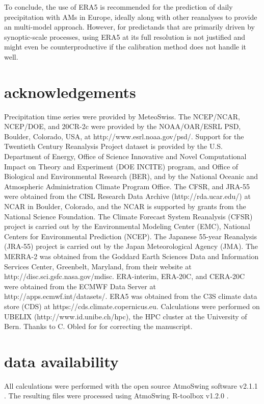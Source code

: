 \documentclass[alpha-refs]{wiley-article}
\begin{document}
To conclude, the use of ERA5 is recommended for the prediction of daily precipitation with AMs in Europe, ideally along with other reanalyses to provide an multi-model approach. However, for predictands that are primarily driven by synoptic-scale processes, using ERA5 at its full resolution is not justified and might even be counterproductive if the calibration method does not handle it well.



\section*{acknowledgements}
Precipitation time series were provided by MeteoSwiss. The NCEP/NCAR, NCEP/DOE, and 20CR-2c were provided by the NOAA/OAR/ESRL PSD, Boulder, Colorado, USA, at http://www.esrl.noaa.gov/psd/. Support for the Twentieth Century Reanalysis Project dataset is provided by the U.S. Department of Energy, Office of Science Innovative and Novel Computational Impact on Theory and Experiment (DOE INCITE) program, and Office of Biological and Environmental Research (BER), and by the National Oceanic and Atmospheric Administration Climate Program Office. The CFSR, and JRA-55 were obtained from the CISL Research Data Archive (http://rda.ucar.edu/) at NCAR in Boulder, Colorado, and the NCAR is supported by grants from the National Science Foundation. The Climate Forecast System Reanalysis (CFSR) project is carried out by the Environmental Modeling Center (EMC), National Centers for Environmental Prediction (NCEP). The Japanese 55-year Reanalysis (JRA-55) project is carried out by the Japan Meteorological Agency (JMA). The MERRA-2 was obtained from the Goddard Earth Sciences Data and Information Services Center, Greenbelt, Maryland, from their website at http://disc.sci.gsfc.nasa.gov/mdisc. ERA-interim, ERA-20C, and CERA-20C were obtained from the ECMWF Data Server at http://apps.ecmwf.int/datasets/. ERA5 was obtained from the C3S climate data store (CDS) at https://cds.climate.copernicus.eu. Calculations were performed on UBELIX (http://www.id.unibe.ch/hpc), the HPC cluster at the University of Bern. Thanks to C. Obled for for correcting the manuscript.


\section*{data availability}
All calculations were performed with the open source AtmoSwing software v2.1.1 \citep{Horton2019c}. The resulting files were processed using AtmoSwing R-toolbox v1.2.0 \citep{Horton2018d}.
\end{document}
